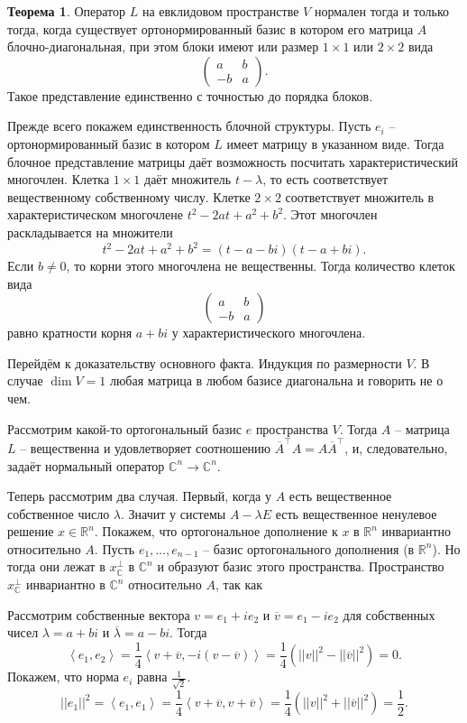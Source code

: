 \documentclass[10pt,a4paper,oneside]{book} %
\theoremstyle{definition}
\newtheorem{thm}{Теорема}
\newcommand{\mb}[1]{\mathbb{#1}}
\newcommand{\ovl}{\overline}
\def\lan{\left\langle }
\def\ran{\right\rangle}
\def\thrm{\begin{thm}}
\def\ethrm{\end{thm}}
\begin{document}
\thrm
Оператор $L$ на евклидовом пространстве $V$ нормален  тогда и только тогда, когда существует ортонормированный базис в котором его матрица $A$ блочно-диагональная, при этом блоки имеют  или размер $1\times 1$ или $2\times 2$ вида
$$\begin{pmatrix}
a  & b\\
-b & a
\end{pmatrix}.$$
Такое представление единственно с точностью до порядка блоков.
\ethrm
\proof
Прежде всего покажем единственность блочной структуры. Пусть $e_i$ -- ортонормированный базис в котором $L$ имеет матрицу в указанном виде. Тогда блочное представление матрицы даёт возможность посчитать характеристический многочлен. Клетка $1\times 1$ даёт множитель $t-\lambda$, то есть соответствует вещественному собственному числу. Клетке $2\times 2$ соответствует множитель в характеристическом многочлене $t^2-2at+a^2+b^2$. Этот многочлен раскладывается на множители $$t^2-2at+a^2+b^2= (t-a-bi)(t-a+bi).$$
Если $b\neq 0$, то корни этого многочлена не вещественны. Тогда количество клеток вида 
$$\begin{pmatrix}
a  & b\\
-b & a
\end{pmatrix}$$
равно кратности корня $a+bi$ у характеристического многочлена.



Перейдём к доказательству основного факта. Индукция по размерности $V$. В случае $\dim V=1$ любая матрица в любом базисе диагональна и говорить не о чем. 



Рассмотрим какой-то ортогональный базис $e$ пространства $V$. Тогда $A$ -- матрица $L$ -- вещественна и удовлетворяет соотношению $\ovl{A}^{\top}A=A\ovl{A}^{\top}$, и, следовательно, задаёт нормальный оператор $\mb C^n \to \mb C^n$.

Теперь рассмотрим два случая. Первый, когда у $A$ есть вещественное собственное число $\lambda$. Значит у системы $A-\lambda E$ есть вещественное ненулевое решение $x\in \mb R^n$. Покажем, что ортогональное дополнение к $x$ в $\mb R^n$ инвариантно относительно $A$. Пусть $e_1,\dots,e_{n-1} $ -- базис ортогонального дополнения (в $\mb R^n$). Но тогда они лежат в $x^{\bot}_{\mb C}$ в $\mb C^n$ и образуют базис этого пространства. Пространство $x^{\bot}_{\mb C}$ инвариантно в $\mb C^n$ относительно $A$, так как  


Рассмотрим собственные вектора $v=e_1 + i e_2 $ и $\ovl{v}=e_1-ie_2$ для собственных чисел $\lambda= a+bi$ и $\ovl{\lambda}=a-bi$. Тогда
$$\lan e_1, e_2\ran = \frac{1}{4} \lan v+\ovl{v}, -i( v-\ovl{v})\ran= \frac{1}{4}(||v||^2-||\ovl{v}||^2)=0.$$
Покажем, что норма $e_i$ равна $\frac{1}{\sqrt{2}}$.
$$||e_1||^2=\lan e_1, e_1\ran = \frac{1}{4} \lan v+\ovl{v},  v+\ovl{v}\ran= \frac{1}{4}(||v||^2+||\ovl{v}||^2)=\frac{1}{2}.$$
\end{document}
